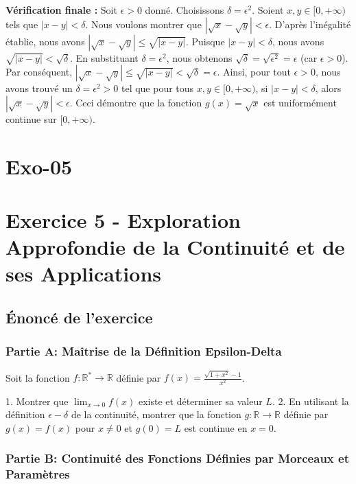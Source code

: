 \documentclass[12pt,a4paper]{report}
\begin{document}
    \textbf{Vérification finale :}
    Soit $\epsilon > 0$ donné.
    Choisissons $\delta = \epsilon^2$.
    Soient $x, y \in [0, +\infty)$ tels que $|x - y| < \delta$.
    Nous voulons montrer que $|\sqrt{x} - \sqrt{y}| < \epsilon$.
    D'après l'inégalité établie, nous avons $|\sqrt{x} - \sqrt{y}| \le \sqrt{|x - y|}$.
    Puisque $|x - y| < \delta$, nous avons $\sqrt{|x - y|} < \sqrt{\delta}$.
    En substituant $\delta = \epsilon^2$, nous obtenons $\sqrt{\delta} = \sqrt{\epsilon^2} = \epsilon$ (car $\epsilon > 0$).
    Par conséquent, $|\sqrt{x} - \sqrt{y}| \le \sqrt{|x - y|} < \sqrt{\delta} = \epsilon$.
    Ainsi, pour tout $\epsilon > 0$, nous avons trouvé un $\delta = \epsilon^2 > 0$ tel que pour tous $x, y \in [0, +\infty)$, si $|x - y| < \delta$, alors $|\sqrt{x} - \sqrt{y}| < \epsilon$.
    Ceci démontre que la fonction $g(x) = \sqrt{x}$ est uniformément continue sur $[0, +\infty)$.

\section{Exo-05}
\section{Exercice 5 - Exploration Approfondie de la Continuité et de ses Applications}

\subsection{Énoncé de l'exercice}

\subsubsection{Partie A: Maîtrise de la Définition Epsilon-Delta}

Soit la fonction $f: \mathbb{R}^* \to \mathbb{R}$ définie par $f(x) = \frac{\sqrt{1+x^2} - 1}{x^2}$.

1.  Montrer que $\lim_{x \to 0} f(x)$ existe et déterminer sa valeur $L$.
2.  En utilisant la définition $\epsilon-\delta$ de la continuité, montrer que la fonction $g: \mathbb{R} \to \mathbb{R}$ définie par $g(x) = f(x)$ pour $x \neq 0$ et $g(0) = L$ est continue en $x=0$.

\subsubsection{Partie B: Continuité des Fonctions Définies par Morceaux et Paramètres}
\end{document}
